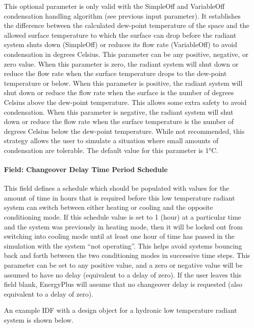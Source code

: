 This optional parameter is only valid with the SimpleOff and VariableOff condensation handling algorithm (see previous input parameter). It establishes the difference between the calculated dew-point temperature of the space and the allowed surface temperature to which the surface can drop before the radiant system shuts down (SimpleOff) or reduces its flow rate (VariableOff) to avoid condensation in degrees Celsius. This parameter can be any positive, negative, or zero value. When this parameter is zero, the radiant system will shut down or reduce the flow rate when the surface temperature drops to the dew-point temperature or below. When this parameter is positive, the radiant system will shut down or reduce the flow rate when the surface is the number of degrees Celsius above the dew-point temperature. This allows some extra safety to avoid condensation. When this parameter is negative, the radiant system will shut down or reduce the flow rate when the surface temperature is the number of degrees Celsius below the dew-point temperature. While not recommended, this strategy allows the user to simulate a situation where small amounts of condensation are tolerable.  The default value for this parameter is 1°C.


\paragraph{Field: Changeover Delay Time Period Schedule}\label{field-changeover-delay-time-period-schedule}

This field defines a schedule which should be populated with values for the amount of time in hours that is required before this low temperature radiant system can switch between either heating or cooling and the opposite conditioning mode.  If this schedule value is set to 1 (hour) at a particular time and the system was previously in heating mode, then it will be locked out from switching into cooling mode until at least one hour of time has passed in the simulation with the system ``not operating''.  This helps avoid systems bouncing back and forth between the two conditioning modes in successive time steps.  This parameter can be set to any positive value, and a zero or negative value will be assumed to have no delay (equivalent to a delay of zero).  If the user leaves this field blank, EnergyPlus will assume that no changeover delay is requested (also equivalent to a delay of zero).

An example IDF with a design object for a hydronic low temperature radiant system is shown below.

